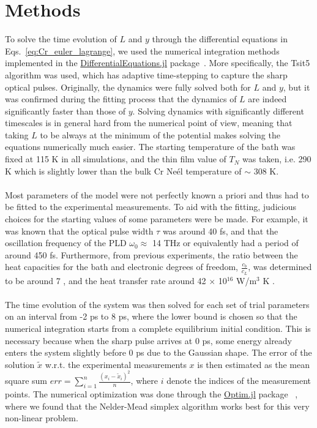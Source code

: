\section{Methods \label{sec:Cr_Methods}}
To solve the time evolution of $L$ and $y$ through the differential equations in Eqs.~\ref{eq:Cr_euler_lagrange}, we used the numerical integration methods implemented in the \href{https://github.com/SciML/DifferentialEquations.jl}{DifferentialEquations.jl} package~\cite{rackauckas2017differentialequations}. More specifically, the Tsit5 algorithm was used, which has adaptive time-stepping to capture the sharp optical pulses.
Originally, the dynamics were fully solved both for $L$ and $y$, but it was confirmed during the fitting process that the dynamics of $L$ are indeed significantly faster than those of $y$.
Solving dynamics with significantly different timescales is in general hard from the numerical point of view, meaning that taking $L$ to be always at the minimum of the potential makes solving the equations numerically much easier.
The starting temperature of the bath was fixed at 115 K in all simulations, and the thin film value of $T_N$ was taken, i.e. 290 K which is slightly lower than the bulk Cr Ne\'el temperature of $\sim$ 308 K.
\\\\
Most parameters of the model were not perfectly known a priori and thus had to be fitted to the experimental measurements.
To aid with the fitting, judicious choices for the starting values of some parameters were be made.
For example, it was known that the optical pulse width $\tau$ was around 40 fs, and that the oscillation frequency of the PLD $\omega_0 \approx$ 14 THz or equivalently had a period of around 450 fs.
Furthermore, from previous experiments, the ratio between the heat capacities for the bath and electronic degrees of freedom, $\frac{c_b}{c_L}$, was determined to be around 7 \cite{Nicholson2016}, and the heat transfer rate around 42 $\times$ 10$^{16}$ W/m$^3$ K \cite{Hostetler1999}.
\\\\
The time evolution of the system was then solved for each set of trial parameters on an interval from -2 ps to 8 ps, where the lower bound is chosen so that the numerical integration starts from a complete equilibrium initial condition.
This is necessary because when the sharp pulse arrives at 0 ps, some energy already enters the system slightly before 0 ps due to the Gaussian shape.
The error of the solution $\tilde{x}$ w.r.t. the experimental measurements $x$ is then estimated as the mean square sum $err = \sum_{i=1}^n \frac{(x_i - \tilde{x}_i)^2}{n}$, where $i$ denote the indices of the measurement points.
The numerical optimization was done through the \href{https://github.com/JuliaNLSolvers/Optim.jl}{Optim.jl} package ~\cite{mogensen2018optim}, where we found that the Nelder-Mead simplex algorithm \cite{Nelder1965} works best for this very non-linear problem.

